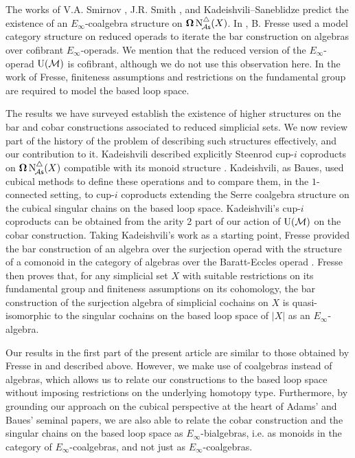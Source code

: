 The works of V.A. Smirnov \cite{smirnov1990iterated}, J.R. Smith \cite{smith1994cobar, smith2000operads}, and Kadeishvili–Saneblidze \cite{kadeishvili1998iterating} predict the existence of an $E_\infty$-coalgebra structure on $\operatorname{\mathbf{\Omega}} \operatorname{N^{\triangle}_{\!{\mathcal{A}\mathsf{s}}}}(X)$.
In \cite{fresse2010bar}, B. Fresse used a model category structure on reduced operads \cite{berger2003modelcategory, hinich1997homologicalalgebra} to iterate the bar construction on algebras over cofibrant $E_\infty$-operads.
We mention that the reduced version of the $E_\infty$-operad ${\operatorname{U}(\mathcal{M})}$ is cofibrant, although we do not use this observation here.
In the work of Fresse, finiteness assumptions and restrictions on the fundamental group are required to model the based loop space.

The results we have surveyed establish the existence of higher structures on the bar and cobar constructions associated to reduced simplicial sets.
We now review part of the history of the problem of describing such structures effectively, and our contribution to it.
Kadeishvili described explicitly Steenrod cup-$i$ coproducts on $\operatorname{\mathbf{\Omega}} \operatorname{N^{\triangle}_{\!{\mathcal{A}\mathsf{s}}}}(X)$ compatible with its monoid structure \cite{kadeishvili1999coproducts, kadeishvili2003cupi}.
Kadeishvili, as Baues, used cubical methods to define these operations and to compare them, in the $1$-connected setting, to cup-$i$ coproducts extending the Serre coalgebra structure on the cubical singular chains on the based loop space.
Kadeishvili's cup-$i$ coproducts can be obtained from the arity 2 part of our action of ${\operatorname{U}(\mathcal{M})}$ on the cobar construction.
Taking Kadeishvili's work as a starting point, Fresse provided the bar construction of an algebra over the surjection operad with the structure of a comonoid in the category of algebras over the Baratt-Eccles operad \cite{fresse2003hopf}.
Fresse then proves that, for any simplicial set $X$ with suitable restrictions on its fundamental group and finiteness assumptions on its cohomology, the bar construction of the surjection algebra of simplicial cochains on $X$ is quasi-isomorphic to the singular cochains on the based loop space of $|X|$ as an $E_{\infty}$-algebra.

Our results in the first part of the present article are similar to those obtained by Fresse in \cite{fresse2003hopf} and described above.
However, we make use of coalgebras instead of algebras, which allows us to relate our constructions to the based loop space without imposing restrictions on the underlying homotopy type.
Furthermore, by grounding our approach on the cubical perspective at the heart of Adams' and Baues' seminal papers, we are also able to relate the cobar construction and the singular chains on the based loop space as $E_{\infty}$-bialgebras, i.e. as monoids in the category of $E_{\infty}$-coalgebras, and not just as $E_{\infty}$-coalgebras.

